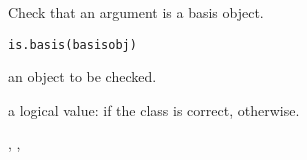 \begin{Description}\relax
Check that an argument is a basis object.
\end{Description}
\begin{Usage}
\begin{verbatim}
is.basis(basisobj)
\end{verbatim}
\end{Usage}
\begin{Arguments}
\begin{ldescription}
\item[\code{basisobj}] an object to be checked.

\end{ldescription}
\end{Arguments}
\begin{Value}
a logical value:
 if the class is correct,  otherwise.
\end{Value}
\begin{SeeAlso}\relax
{}, 
, 
\end{SeeAlso}

